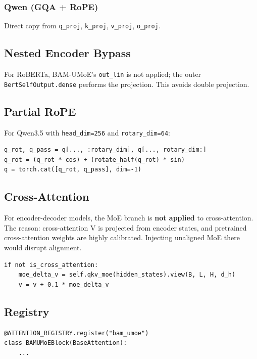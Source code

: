 \subsubsection{Qwen (GQA + RoPE)}
Direct copy from \texttt{q\_proj}, \texttt{k\_proj}, \texttt{v\_proj}, \texttt{o\_proj}.

\subsection{Nested Encoder Bypass}

For RoBERTa, BAM-UMoE's \texttt{out\_lin} is not applied; the outer 
\texttt{BertSelfOutput.dense} performs the projection. This avoids double projection.

\subsection{Partial RoPE}

For Qwen3.5 with \texttt{head\_dim=256} and \texttt{rotary\_dim=64}:
\begin{lstlisting}
q_rot, q_pass = q[..., :rotary_dim], q[..., rotary_dim:]
q_rot = (q_rot * cos) + (rotate_half(q_rot) * sin)
q = torch.cat([q_rot, q_pass], dim=-1)
\end{lstlisting}

\subsection{Cross-Attention}

For encoder-decoder models, the MoE branch is \textbf{not applied} to 
cross-attention. The reason: cross-attention V is projected from encoder 
states, and pretrained cross-attention weights are highly calibrated. 
Injecting unaligned MoE there would disrupt alignment.

\begin{lstlisting}
if not is_cross_attention:
    moe_delta_v = self.qkv_moe(hidden_states).view(B, L, H, d_h)
    v = v + 0.1 * moe_delta_v
\end{lstlisting}

\subsection{Registry}

\begin{lstlisting}
@ATTENTION_REGISTRY.register("bam_umoe")
class BAMUMoEBlock(BaseAttention):
    ...
\end{lstlisting}

